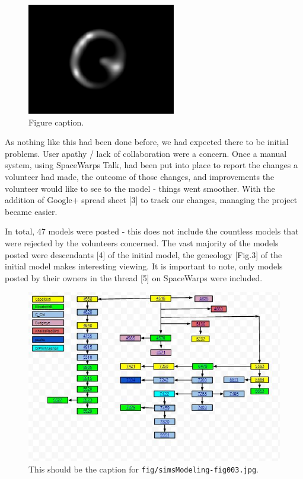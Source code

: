 \documentclass{article}
\begin{document}
\begin{figure}
\centering
\includegraphics[width=184pt]{fig/simsModeling-fig002.png}
\caption{Figure caption.}
\end{figure}

As nothing like this had been done before, we had expected there to be initial 
problems. User apathy / lack of collaboration were a concern. Once a manual system, 
using SpaceWarps Talk, had been put into place to report the changes a volunteer 
had made, the outcome of those changes, and improvements the volunteer would like 
to see to the model - things went smoother. With the addition of Google+ spread 
sheet {\small{}[3]} to track our changes, managing the project became easier.

In total, 47 models were posted - this does not include the countless models that 
were rejected by the volunteers concerned. The vast majority of the models posted 
were descendants {\small{}[4]} of the initial model, the geneology [Fig.3] of the 
initial model makes interesting viewing. It is important to note, only models posted 
by their owners in the thread {\small{}[5]} on SpaceWarps were included.

\begin{figure}
\centering
\includegraphics[width=500pt,angle=90,origin=c]{fig/simsModeling-fig003.jpg}
\caption{This should be the caption for \texttt{fig/simsModeling-fig003.jpg}.}
\end{figure}
\end{document}

